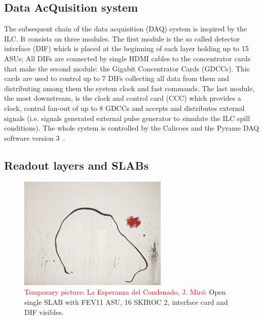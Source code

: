 \documentclass[a4paper,11pt]{article}
\newcommand{\todo}[1]{\textcolor{red}{{#1}}}
\begin{document}
\subsection{Data AcQuisition system}
\label{sec:DAQ}

The subsequent chain of the data acquisition (DAQ)\cite{Gastaldi:2014vaa} system is inspired by the ILC.
It consists on three modules.
The first module is the so called detector interface (DIF) which is placed at the beginning of each layer holding up to 15 ASUs;
All DIFs are connected by single HDMI cables to the concentrator cards that make
the second module: the Gigabit Concentrator Cards (GDCCs).
This cards are used to control up to 7 DIFs collecting all data from them and distributing among them the system clock and fast commands.
The last module, the most downstream, is the clock and control card (CCC) which
provides a clock, control fan-out of up to 8 GDCCs and accepts and distributes external signals (i.e. signals
generated external pulse generator to simulate the ILC spill conditions).
The whole system is controlled by the Calicoes and the Pyrame DAQ software version 3~\cite{Rubio-Roy:2017ere,Magniette:2018wdz}.

\subsection{Readout layers and SLABs}
\label{sec:setup}

\begin{figure}[!t]
  \centering
    \includegraphics[width=2.8in]{figs/test.jpg} 
  \caption{\todo{Temporary picture: La Esperanza del Condenado, J. Miró}: Open single SLAB with FEV11 ASU, 16 SKIROC 2, interface card and DIF visibles. }
\label{ASU2}
\end{figure}
\end{document}
